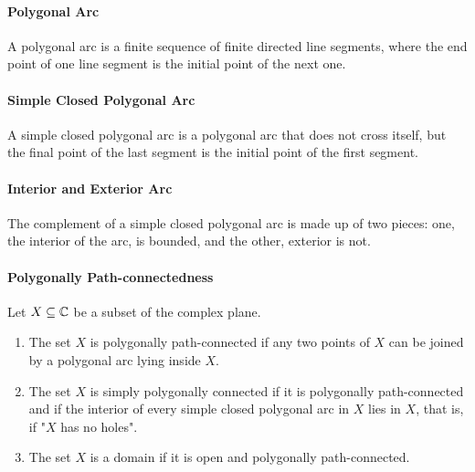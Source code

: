 \paragraph{Polygonal Arc}
A polygonal arc is a finite sequence of finite directed line segments, where the end point of one line segment is the initial point of the next one.

\paragraph{Simple Closed Polygonal Arc}
A simple closed polygonal arc is a polygonal arc that does not cross itself, but the final point of the last segment is the initial point of the first segment.

\paragraph{Interior and Exterior Arc}
The complement of a simple closed polygonal arc is made up of two pieces: one, the interior of the arc, is bounded, and the other, exterior is not.

\paragraph{Polygonally Path-connectedness}
Let \(X \subseteq \mathbb{C}\) be a subset of the complex plane.
\begin{enumerate}[label=(\arabic*)]
    \item The set \(X\) is polygonally path-connected if any two points of \(X\) can be joined by a polygonal arc lying inside \(X\).
    \item The set \(X\) is simply polygonally connected if it is polygonally path-connected and if the interior of every simple closed polygonal arc in \(X\) lies in \(X\), that is, if "\(X\) has no holes".
    \item The set \(X\) is a domain if it is open and polygonally path-connected.
\end{enumerate}